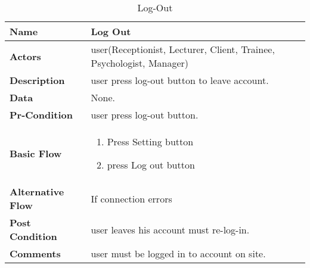 \documentclass[../Psychological_system_web_application.tex]{subfiles}
\begin{document}
	\begin{center}
		\begin{table}[h]
			\begin{tabular}{ | m{4cm} | m{10cm}| } 
				\hline
			 	\textbf{\large Name}& Log Out\\ 
				\hline
			  	\textbf{\large Actors}& user(Receptionist, Lecturer, Client, Trainee, Psychologist, Manager)\\ 
				\hline
			  	\textbf{\large Description}& user press log-out button to leave account.\\ 
				\hline
				\textbf{\large Data}& None.\\ 
				\hline
				 \textbf{\large Pr-Condition}& user press log-out button. \\ 
				\hline
				\textbf{\large Basic Flow}&\begin{enumerate}
				\item
					Press Setting button 
				\item
					press Log out button \end{enumerate}\\
					\hline
				\textbf{\large Alternative Flow}& If connection errors\\ 
				\hline
				\textbf{\large Post Condition}& user leaves his account must re-log-in.\\ 
				\hline
				\textbf{\large Comments}& user must be logged in to account on site.\\ 
				\hline
			\end{tabular}
			\caption{Log-Out}
			\label{table:LOG_OUT}
		\end{table}
	\end{center}
\end{document}
